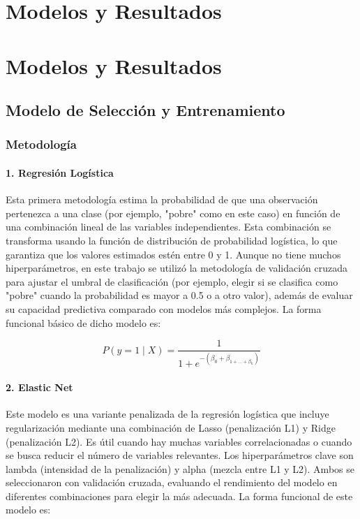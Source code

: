 \documentclass[12pt,a4paper,onecolumn]{article}
\begin{document}
\section{Modelos y Resultados}
\section{Modelos y Resultados}
\subsection{Modelo de Selección y Entrenamiento}

\subsubsection{Metodología}

\paragraph{1. Regresión Logística}

Esta primera metodología estima la probabilidad de que una observación pertenezca a una clase (por ejemplo, "pobre" como en este caso) en función de una combinación lineal de las variables independientes. Esta combinación se transforma usando la función de distribución de probabilidad logística, lo que garantiza que los valores estimados estén entre 0 y 1. Aunque no tiene muchos hiperparámetros, en este trabajo se utilizó la metodología de validación cruzada para ajustar el umbral de clasificación (por ejemplo, elegir si se clasifica como "pobre" cuando la probabilidad es mayor a 0.5 o a otro valor), además de evaluar su capacidad predictiva comparado con modelos más complejos. La forma funcional básico de dicho modelo es:

$$P\left( y = 1 \middle| X \right) = \frac{1}{1 + e^{- (\beta_{0} + \beta_{1 + \ldots + \beta_{k}})}}$$

\paragraph{2. Elastic Net}

Este modelo es una variante penalizada de la regresión logística que incluye regularización mediante una combinación de Lasso (penalización L1) y Ridge (penalización L2). Es útil cuando hay muchas variables correlacionadas o cuando se busca reducir el número de variables relevantes. Los hiperparámetros clave son lambda (intensidad de la penalización) y alpha (mezcla entre L1 y L2). Ambos se seleccionaron con validación cruzada, evaluando el rendimiento del modelo en diferentes combinaciones para elegir la más adecuada. La forma funcional de este modelo es:
\end{document}
